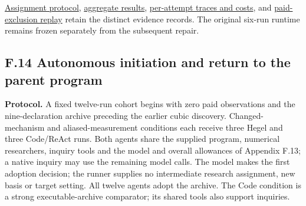 \documentclass[11pt,a4paper]{article}
\begin{document}
\hyperlink{artifact-107}{Assignment protocol}, \hyperlink{artifact-108}{aggregate results}, \hyperlink{artifact-109}{per-attempt traces and costs}, and \hyperlink{artifact-110}{paid-exclusion replay} retain the distinct evidence records. The original six-run runtime remains frozen separately from the subsequent repair.


\subsection*{F.14 Autonomous initiation and return to the parent program}

\textbf{Protocol.} A fixed twelve-run cohort begins with zero paid observations and the nine-declaration archive preceding the earlier cubic discovery. Changed-mechanism and aliased-measurement conditions each receive three Hegel and three Code/ReAct runs. Both agents share the supplied program, numerical researchers, inquiry tools and the model and overall allowances of Appendix F.13; a native inquiry may use the remaining model calls. The model makes the first adoption decision; the runner supplies no intermediate research assignment, new basis or target setting. All twelve agents adopt the archive. The Code condition is a strong executable-archive comparator; its shared tools also support inquiries.
\end{document}
